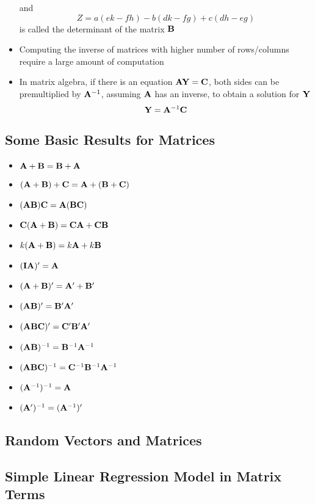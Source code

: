 \begin{itemize}
and $$ Z = a(ek - fh) - b(dk - fg) + c(dh - eg) $$ is called the determinant of the matrix $\mathbf{B}$ 
\item Computing the inverse of matrices with higher number of rows/columns require a large amount of computation
\item In matrix algebra, if there is an equation $\mathbf{AY} = \mathbf{C}$, both sides can be premultiplied by $\mathbf{A}^{-1}$, assuming $\mathbf{A}$ has an inverse, to obtain a solution for $\mathbf{Y}$
$$ \mathbf{Y} = \mathbf{A}^{-1}\mathbf{C} $$ 
\end{itemize}

\subsection{Some Basic Results for Matrices} 
\begin{itemize} 
\item $ \mathbf{A} + \mathbf{B} = \mathbf{B} + \mathbf{A} $ 
\item $ (\mathbf{A} + \mathbf{B}) + \mathbf{C} = \mathbf{A} + (\mathbf{B} + \mathbf{C}) $
\item $ (\mathbf{AB})\mathbf{C} = \mathbf{A}(\mathbf{BC}) $
\item $ \mathbf{C}(\mathbf{A} + \mathbf{B}) = \mathbf{CA} + \mathbf{CB} $
\item $ k(\mathbf{A} + \mathbf{B}) = k\mathbf{A} + k\mathbf{B} $
\item $ (\mathbf{I} \mathbf{A})' = \mathbf{A} $
\item $ (\mathbf{A} + \mathbf{B})' = \mathbf{A}' + \mathbf{B}' $
\item $ (\mathbf{AB})' = \mathbf{B}'\mathbf{A}' $
\item $ (\mathbf{ABC})' = \mathbf{C}' \mathbf{B}' \mathbf{A}' $
\item $ (\mathbf{AB})^{-1} = \mathbf{B}^{-1} \mathbf{A}^{-1} $ 
\item $ (\mathbf{ABC})^{-1} = \mathbf{C}^{-1} \mathbf{B}^{-1} \mathbf{A}^{-1} $ 
\item $ (\mathbf{A}^{-1})^{-1} = \mathbf{A} $ 
\item $ (\mathbf{A}')^{-1} = (\mathbf{A}^{-1})' $ 
\end{itemize} 

\subsection{Random Vectors and Matrices}

\subsection{Simple Linear Regression Model in Matrix Terms}

